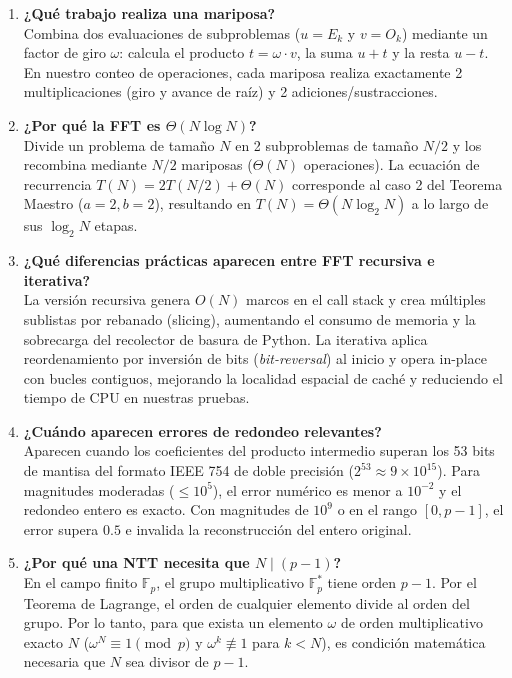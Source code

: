 \begin{enumerate}
    \item \textbf{¿Qué trabajo realiza una mariposa?}\\
    Combina dos evaluaciones de subproblemas ($u = E_k$ y $v = O_k$) mediante un factor de giro $\omega$: calcula el producto $t = \omega \cdot v$, la suma $u + t$ y la resta $u - t$. En nuestro conteo de operaciones, cada mariposa realiza exactamente 2 multiplicaciones (giro y avance de raíz) y 2 adiciones/sustracciones.

    \item \textbf{¿Por qué la FFT es $\Theta(N\log N)$?}\\
    Divide un problema de tamaño $N$ en 2 subproblemas de tamaño $N/2$ y los recombina mediante $N/2$ mariposas ($\Theta(N)$ operaciones). La ecuación de recurrencia $T(N) = 2T(N/2) + \Theta(N)$ corresponde al caso 2 del Teorema Maestro ($a=2, b=2$), resultando en $T(N) = \Theta(N \log_2 N)$ a lo largo de sus $\log_2 N$ etapas.

    \item \textbf{¿Qué diferencias prácticas aparecen entre FFT recursiva e iterativa?}\\
    La versión recursiva genera $O(N)$ marcos en el call stack y crea múltiples sublistas por rebanado (slicing), aumentando el consumo de memoria y la sobrecarga del recolector de basura de Python. La iterativa aplica reordenamiento por inversión de bits (\emph{bit-reversal}) al inicio y opera in-place con bucles contiguos, mejorando la localidad espacial de caché y reduciendo el tiempo de CPU en nuestras pruebas.

    \item \textbf{¿Cuándo aparecen errores de redondeo relevantes?}\\
    Aparecen cuando los coeficientes del producto intermedio superan los 53 bits de mantisa del formato IEEE 754 de doble precisión ($2^{53} \approx 9 \times 10^{15}$). Para magnitudes moderadas ($\le 10^5$), el error numérico es menor a $10^{-2}$ y el redondeo entero es exacto. Con magnitudes de $10^9$ o en el rango $[0, p-1]$, el error supera $0.5$ e invalida la reconstrucción del entero original.

    \item \textbf{¿Por qué una NTT necesita que $N \mid (p-1)$?}\\
    En el campo finito $\mathbb{F}_p$, el grupo multiplicativo $\mathbb{F}_p^*$ tiene orden $p-1$. Por el Teorema de Lagrange, el orden de cualquier elemento divide al orden del grupo. Por lo tanto, para que exista un elemento $\omega$ de orden multiplicativo exacto $N$ ($\omega^N \equiv 1 \pmod p$ y $\omega^k \not\equiv 1$ para $k < N$), es condición matemática necesaria que $N$ sea divisor de $p-1$.


\end{enumerate}
